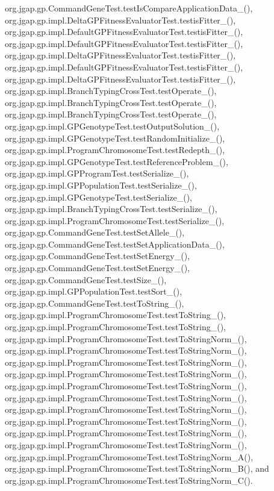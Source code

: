 org.\-jgap.\-gp.\-Command\-Gene\-Test.\-test\-Is\-Compare\-Application\-Data\-\_(), org.\-jgap.\-gp.\-impl.\-Delta\-G\-P\-Fitness\-Evaluator\-Test.\-testis\-Fitter\-\_(), org.\-jgap.\-gp.\-impl.\-Default\-G\-P\-Fitness\-Evaluator\-Test.\-testis\-Fitter\-\_(), org.\-jgap.\-gp.\-impl.\-Default\-G\-P\-Fitness\-Evaluator\-Test.\-testis\-Fitter\-\_(), org.\-jgap.\-gp.\-impl.\-Delta\-G\-P\-Fitness\-Evaluator\-Test.\-testis\-Fitter\-\_(), org.\-jgap.\-gp.\-impl.\-Default\-G\-P\-Fitness\-Evaluator\-Test.\-testis\-Fitter\-\_(), org.\-jgap.\-gp.\-impl.\-Delta\-G\-P\-Fitness\-Evaluator\-Test.\-testis\-Fitter\-\_(), org.\-jgap.\-gp.\-impl.\-Branch\-Typing\-Cross\-Test.\-test\-Operate\-\_(), org.\-jgap.\-gp.\-impl.\-Branch\-Typing\-Cross\-Test.\-test\-Operate\-\_(), org.\-jgap.\-gp.\-impl.\-Branch\-Typing\-Cross\-Test.\-test\-Operate\-\_(), org.\-jgap.\-gp.\-impl.\-G\-P\-Genotype\-Test.\-test\-Output\-Solution\-\_(), org.\-jgap.\-gp.\-impl.\-G\-P\-Genotype\-Test.\-test\-Random\-Initialize\-\_(), org.\-jgap.\-gp.\-impl.\-Program\-Chromosome\-Test.\-test\-Redepth\-\_(), org.\-jgap.\-gp.\-impl.\-G\-P\-Genotype\-Test.\-test\-Reference\-Problem\-\_(), org.\-jgap.\-gp.\-impl.\-G\-P\-Program\-Test.\-test\-Serialize\-\_(), org.\-jgap.\-gp.\-impl.\-G\-P\-Population\-Test.\-test\-Serialize\-\_(), org.\-jgap.\-gp.\-impl.\-G\-P\-Genotype\-Test.\-test\-Serialize\-\_(), org.\-jgap.\-gp.\-impl.\-Branch\-Typing\-Cross\-Test.\-test\-Serialize\-\_(), org.\-jgap.\-gp.\-impl.\-Program\-Chromosome\-Test.\-test\-Serialize\-\_(), org.\-jgap.\-gp.\-Command\-Gene\-Test.\-test\-Set\-Allele\-\_(), org.\-jgap.\-gp.\-Command\-Gene\-Test.\-test\-Set\-Application\-Data\-\_(), org.\-jgap.\-gp.\-Command\-Gene\-Test.\-test\-Set\-Energy\-\_(), org.\-jgap.\-gp.\-Command\-Gene\-Test.\-test\-Set\-Energy\-\_(), org.\-jgap.\-gp.\-Command\-Gene\-Test.\-test\-Size\-\_(), org.\-jgap.\-gp.\-impl.\-G\-P\-Population\-Test.\-test\-Sort\-\_(), org.\-jgap.\-gp.\-Command\-Gene\-Test.\-test\-To\-String\-\_(), org.\-jgap.\-gp.\-impl.\-Program\-Chromosome\-Test.\-test\-To\-String\-\_(), org.\-jgap.\-gp.\-impl.\-Program\-Chromosome\-Test.\-test\-To\-String\-\_(), org.\-jgap.\-gp.\-impl.\-Program\-Chromosome\-Test.\-test\-To\-String\-Norm\-\_(), org.\-jgap.\-gp.\-impl.\-Program\-Chromosome\-Test.\-test\-To\-String\-Norm\-\_(), org.\-jgap.\-gp.\-impl.\-Program\-Chromosome\-Test.\-test\-To\-String\-Norm\-\_(), org.\-jgap.\-gp.\-impl.\-Program\-Chromosome\-Test.\-test\-To\-String\-Norm\-\_(), org.\-jgap.\-gp.\-impl.\-Program\-Chromosome\-Test.\-test\-To\-String\-Norm\-\_(), org.\-jgap.\-gp.\-impl.\-Program\-Chromosome\-Test.\-test\-To\-String\-Norm\-\_(), org.\-jgap.\-gp.\-impl.\-Program\-Chromosome\-Test.\-test\-To\-String\-Norm\-\_(), org.\-jgap.\-gp.\-impl.\-Program\-Chromosome\-Test.\-test\-To\-String\-Norm\-\_(), org.\-jgap.\-gp.\-impl.\-Program\-Chromosome\-Test.\-test\-To\-String\-Norm\-\_(), org.\-jgap.\-gp.\-impl.\-Program\-Chromosome\-Test.\-test\-To\-String\-Norm\-\_(), org.\-jgap.\-gp.\-impl.\-Program\-Chromosome\-Test.\-test\-To\-String\-Norm\-\_\-\-A(), org.\-jgap.\-gp.\-impl.\-Program\-Chromosome\-Test.\-test\-To\-String\-Norm\-\_\-\-B(), and org.\-jgap.\-gp.\-impl.\-Program\-Chromosome\-Test.\-test\-To\-String\-Norm\-\_\-\-C().

